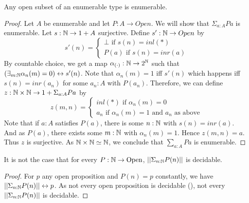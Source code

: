 \begin{lemma}\label{OpenSubsetEnumerableAreEnumerable}
  Any open subset of an enumerable type is enumerable. 
\end{lemma}
\begin{proof}
  Let $A$ be enumerable and let $P:A \to Open$.
  We will show that $\Sigma_{a:A} P a$ is enumerable. 
  Let $s:\mathbb{N} \to 1 + A$ surjective. 
  Define $s':\mathbb{N} \to Open$ by 
  $$
  s'(n) = 
  \begin{cases}
    \bot \text { if } s(n) = inl(*)\\
    P(a) \text { if } s(n) = inr(a)
  \end{cases}
  $$ 
  By countable choice, we get a map 
  $\alpha_{(\cdot)}: \mathbb{N} \to 2^{\mathbb{N}}$  such that 
  $(\exists_{m:\mathbb{N}} \alpha_n(m) = 0) \leftrightarrow s'(n)$. 
  Note that $\alpha_n(m) = 1$ iff 
  $s'(n)$ which happens iff $s(n) = inr(a_n)$ for some $a_n:A$ with $P(a_n)$. 
  Therefore, we can define 
  $z:\mathbb{N} \times \mathbb{N} \to 1 + \Sigma_{a:A} P a$ by 
  \begin{equation}
    z(m,n) = 
    \begin{cases}
      inl(*) \text{ if } \alpha_{n}(m) = 0 \\
      a_n  \text{ if } \alpha_{n}(m) = 1 \text{ and $a_n$ as above}
    \end{cases}
  \end{equation}
  Note that if $a:A$ satisfies $P(a)$, there is some $n:\mathbb{N}$ with $s(n) = inr(a)$. 
  And as $P(a)$, there exists some $m:\mathbb{N}$ with $\alpha_n(m) = 1$. 
  Hence $z(m,n) = a$. 
  Thus $z$ is surjective. 
  As $\mathbb{N} \times \mathbb{N} \simeq \mathbb{N}$, we conclude that 
  $\sum_{a:A} P a$ is enumerable. 
\end{proof}




\begin{lemma}\label{OpenSubsetOfNNotDecidable}
  It is not the case that for every $P:\mathbb{N} \to \mathrm{Open}$, 
  $||\Sigma_{n:\mathbb{N}} P(n)||$ is decidable.
\end{lemma}
\begin{proof}
  For $p$ any open proposition and $P(n) = p$ constantly, we have 
  $||\Sigma_{n:\mathbb{N}} P(n)||\leftrightarrow p$. 
  As not every open proposition is decidable (), 
  not every $||\Sigma_{n:\mathbb{N}} P(n)||$ is decidable. 
\end{proof}

